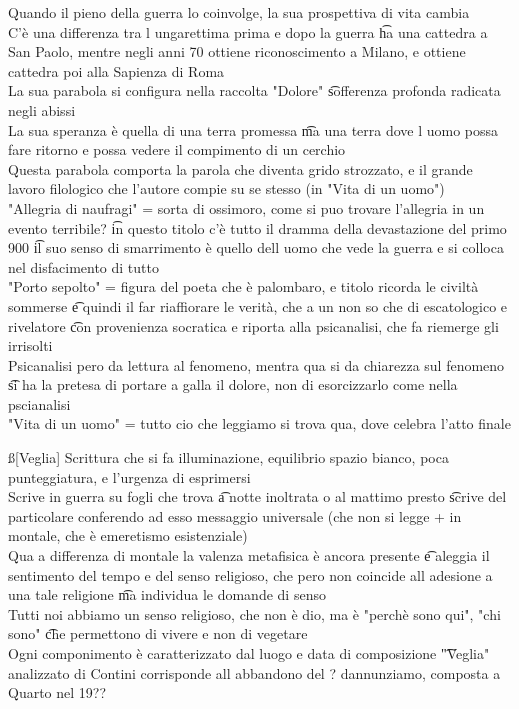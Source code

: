 \documentclass[12pt]{article}
\begin{document}
Quando il pieno della guerra lo coinvolge, la sua prospettiva di vita cambia \\
C'è una differenza tra l ungarettima prima e dopo la guerra \t ha una cattedra a San Paolo, mentre negli anni 70 ottiene riconoscimento a Milano, e ottiene cattedra poi alla Sapienza di Roma \\
La sua parabola si configura nella raccolta "Dolore" \t sofferenza profonda radicata negli abissi \\
La sua speranza è quella di una terra promessa \t ma una terra dove l uomo possa fare ritorno e possa vedere il compimento di un cerchio \\
Questa parabola comporta la parola che diventa grido strozzato, e il grande lavoro filologico che l'autore compie su se stesso (in "Vita di un uomo") \\
"Allegria di naufragi" = sorta di ossimoro, come si puo trovare l'allegria in un evento terribile? \t in questo titolo c'è tutto il dramma della devastazione del primo 900 \t il suo senso di smarrimento è quello dell uomo che vede la guerra e si colloca nel disfacimento di tutto \\
"Porto sepolto" = figura del poeta che è palombaro, e titolo ricorda le civiltà sommerse \t e quindi il far riaffiorare le verità, che a un non so che di escatologico e rivelatore \t con provenienza socratica e riporta alla psicanalisi, che fa riemerge gli irrisolti \\
Psicanalisi pero da lettura al fenomeno, mentra qua si da chiarezza sul fenomeno \t si ha la pretesa di portare a galla il dolore, non di esorcizzarlo come nella pscianalisi \\
"Vita di un uomo" = tutto cio che leggiamo si trova qua, dove celebra l'atto finale

\ss[Veglia]
Scrittura che si fa illuminazione, equilibrio spazio bianco, poca punteggiatura, e l'urgenza di esprimersi \\
Scrive in guerra su fogli che trova \t a notte inoltrata o al mattimo presto \t scrive del particolare conferendo ad esso messaggio universale (che non si legge + in montale, che è emeretismo esistenziale) \\
Qua a differenza di montale la valenza metafisica è ancora presente \t e aleggia il sentimento del tempo e del senso religioso, che pero non coincide all adesione a una tale religione \t ma individua le domande di senso \\
Tutti noi abbiamo un senso religioso, che non è dio, ma è "perchè sono qui", "chi sono" \t che permettono di vivere e non di vegetare \\
Ogni componimento è caratterizzato dal luogo e data di composizione \t "Veglia" analizzato di Contini corrisponde all abbandono del ? dannunziamo, composta a Quarto nel 19??
\end{document}
